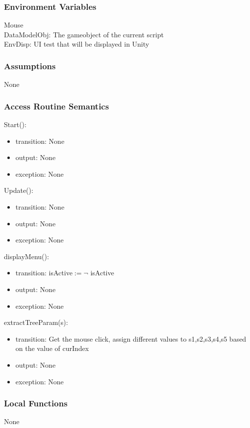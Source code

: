 \documentclass[12pt, titlepage]{article}
\begin{document}
\subsubsection{Environment Variables}
Mouse\\
DataModelObj: The gameobject of the current script\\
EnvDisp: UI test that will be displayed in Unity
\subsubsection{Assumptions}
None
\subsubsection{Access Routine Semantics}

\noindent Start():
\begin{itemize}
\item transition: None
\item output: None
\item exception: None
\end{itemize}


\noindent Update():
\begin{itemize}
\item transition: None
\item output: None
\item exception: None
\end{itemize}

\noindent displayMenu():
\begin{itemize}
\item transition: isActive$\mathit{:= \neg }$ isActive
\item output: None
\item exception: None
\end{itemize}


\noindent extractTreeParam(s):
\begin{itemize}
\item transition: Get the mouse click, assign different values to s1,s2,s3,s4,s5 based on the value of curIndex
\item output: None
\item exception: None
\end{itemize}



\subsubsection{Local Functions}
None
\end{document}
